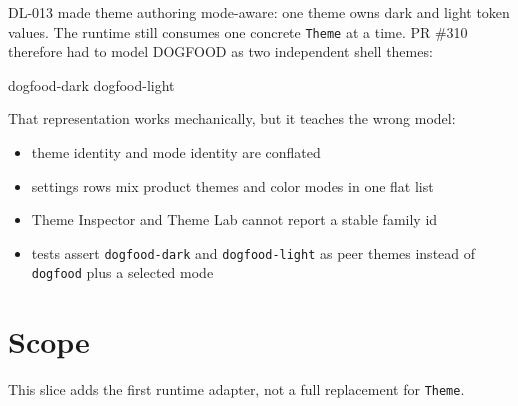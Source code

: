 DL-013 made theme authoring mode-aware: one theme owns dark and light token values. The runtime still consumes one concrete \texttt{T\allowbreak{}h\allowbreak{}e\allowbreak{}m\allowbreak{}e} at a time. PR \#310 therefore had to model DOGFOOD as two independent shell themes:

\begin{CodeBlock}
dogfood-dark
dogfood-light
\end{CodeBlock}

That representation works mechanically, but it teaches the wrong model:

\begin{itemize}
\tightlist
\item
  theme identity and mode identity are conflated
\item
  settings rows mix product themes and color modes in one flat list
\item
  Theme Inspector and Theme Lab cannot report a stable family id
\item
  tests assert \texttt{d\allowbreak{}o\allowbreak{}g\allowbreak{}f\allowbreak{}o\allowbreak{}o\allowbreak{}d\allowbreak{}-\allowbreak{}d\allowbreak{}a\allowbreak{}r\allowbreak{}k} and \texttt{d\allowbreak{}o\allowbreak{}g\allowbreak{}f\allowbreak{}o\allowbreak{}o\allowbreak{}d\allowbreak{}-\allowbreak{}l\allowbreak{}i\allowbreak{}g\allowbreak{}h\allowbreak{}t} as peer themes instead of \texttt{d\allowbreak{}o\allowbreak{}g\allowbreak{}f\allowbreak{}o\allowbreak{}o\allowbreak{}d} plus a selected mode
\end{itemize}

\section{Scope}\label{record-181-scope}

This slice adds the first runtime adapter, not a full replacement for \texttt{T\allowbreak{}h\allowbreak{}e\allowbreak{}m\allowbreak{}e}.

